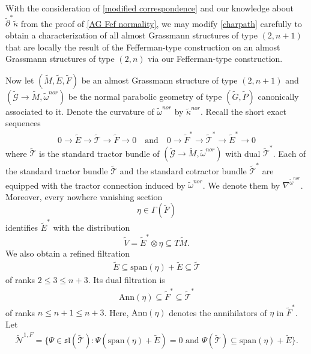 \documentclass[11pt]{amsart}
\begin{document}
With the consideration of \cref{modified correspondence} and our knowledge about $\tilde{\partial}^*\tilde\kappa$ from the proof of \cref{AG Fef normality}, we may modify \cref{charpath} carefully to obtain a characterization of all almost Grassmann structures of type $(2,n+1)$ that are locally the result of the Fefferman-type construction on an almost Grassmann structures of type $(2,n)$ via our Fefferman-type construction.

Now let $(\tilde M,\tilde E,\tilde F)$ be an almost Grassmann structure  of type $(2,n+1)$ and $(\tilde{\mathcal G}\to\tilde M,\tilde\omega^{nor})$ be the normal parabolic geometry of type $(\tilde G,\tilde P)$ canonically associated to it. Denote the curvature of $\tilde\omega^{nor}$ by $\tilde\kappa^{nor}$. Recall the short exact sequences
\begin{align*}
    0\to\tilde E\to\tilde{\mathcal T}\to\tilde F\to 0\quad\text{and}\quad 0\to \tilde F^*\to\tilde{\mathcal T}^*\to\tilde E^*\to 0
\end{align*}
where $\tilde{\mathcal T}$ is the standard tractor bundle of $(\tilde{\mathcal G}\to\tilde M,\tilde\omega^{nor})$ with dual $\tilde{\mathcal T}^*$. Each of the standard tractor bundle $\tilde{\mathcal T}$ and the standard cotractor bundle $\tilde{\mathcal T}^*$ are equipped with the tractor connection induced by $\tilde\omega^{nor}$. We denote them by $\nabla^{\tilde\omega^{nor}}$. Moreover, every nowhere vanishing section 
\[\eta\in\Gamma(\tilde F)\]
identifies $\tilde E^*$ with the distribution
\[\tilde V=\tilde E^*\otimes\eta\subseteq T\tilde M.\]
We also obtain a refined filtration
\begin{align*}
\tilde E\subseteq\mathrm{span}(\eta)+\tilde E\subseteq \tilde{\mathcal T}
\end{align*}
of ranks $2\leq 3\leq n+3$. Its dual filtration is
\begin{align*}\mathrm{Ann}(\eta)\subseteq \tilde F^*\subseteq \tilde{\mathcal T}^*
\end{align*}
of ranks $n\leq n+1\leq n+3$. Here, $\mathrm{Ann}(\eta)$ denotes the annihilators of $\eta$ in $\tilde F^*$. Let
\begin{align*}\tilde{\mathcal N}^{1,F}=\{\Psi\in\mathfrak{sl}(\tilde{\mathcal T}):\Psi(\mathrm{span}(\eta)+\tilde E)=0\text{ and }\Psi(\tilde{\mathcal T})\subseteq\mathrm{span}(\eta)+\tilde E\}.\end{align*}
\end{document}
